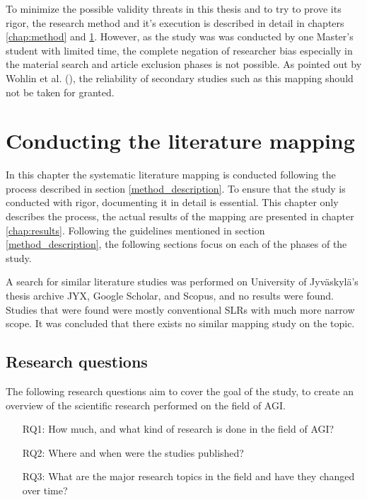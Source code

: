\documentclass[utf8,english]{gradu3}
\begin{document}
To minimize the possible validity threats in this thesis and to try to prove its
rigor, the research method and it's execution is described in detail in chapters
\ref{chap:method} and \ref{chap:conducting}. However, as the study was was
conducted by one Master's student with limited time, the complete negation of
researcher bias especially in the material search and article exclusion phases
is not possible. As pointed out by Wohlin et al. (\cite*{wohlin2013}), the
reliability of secondary studies such as this mapping should not be taken for
granted.


\chapter{Conducting the literature mapping}
\label{chap:conducting}

In this chapter the systematic literature mapping is conducted following the
process described in section \ref{method_description}. To ensure that the study is
conducted with rigor, documenting it in detail is essential. This chapter only
describes the process, the actual results of the mapping are presented in
chapter \ref{chap:results}. Following the guidelines mentioned in section
\ref{method_description}, the following sections focus on each of the phases of
the study.

A search for similar literature studies was performed on University of
Jyväskylä's thesis archive JYX, Google Scholar, and Scopus, and no results were
found. Studies that were found were mostly conventional SLRs with much more
narrow scope. It was concluded that there exists no similar mapping study on the
topic.

\section{Research questions}

The following research questions aim to cover the goal of the study, to create
an overview of the scientific research performed on the field of AGI.

\begin{itemize}
  \item[RQ1:] How much, and what kind of research is done in the field of AGI?
  \item[RQ2:] Where and when were the studies published?
  \item[RQ3:] What are the major research topics in the field and have they
        changed over time?
\end{itemize}
\end{document}
